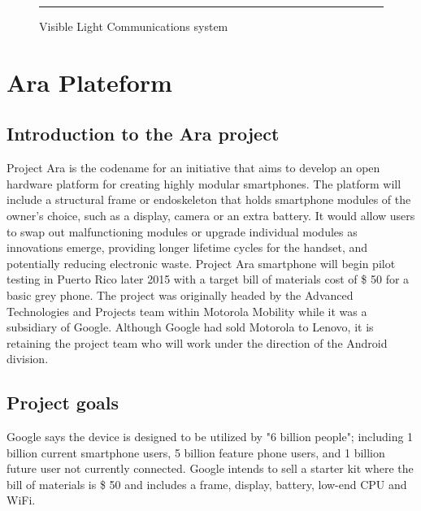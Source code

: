 \begin{figure}[ht]
  \centering
    \rule{35em}{0.5pt}
  \caption[VLC Receiver front-end circuit]{Visible Light Communications system}
  \label{fig:RxCircuit}
\end{figure}

\section{Ara Plateform}
\subsection{Introduction to the Ara project}

Project Ara is the codename for an initiative that aims to develop an open hardware platform for creating highly modular smartphones. The platform will include a structural frame or endoskeleton that holds smartphone modules of the owner's choice, such as a display, camera or an extra battery. It would allow users to swap out malfunctioning modules or upgrade individual modules as innovations emerge, providing longer lifetime cycles for the handset, and potentially reducing electronic waste. Project Ara smartphone will begin pilot testing in Puerto Rico later 2015 with a target bill of materials cost of \$ 50 for a basic grey phone. The project was originally headed by the Advanced Technologies and Projects team within Motorola Mobility while it was a subsidiary of Google. Although Google had sold Motorola to Lenovo, it is retaining the project team who will work under the direction of the Android division.

\subsection{Project goals}
Google says the device is designed to be utilized by "6 billion people"; including 1 billion current smartphone users, 5 billion feature phone users, and 1 billion future user not currently connected. Google intends to sell a starter kit where the bill of materials is \$ 50 and includes a frame, display, battery, low-end CPU and WiFi.

